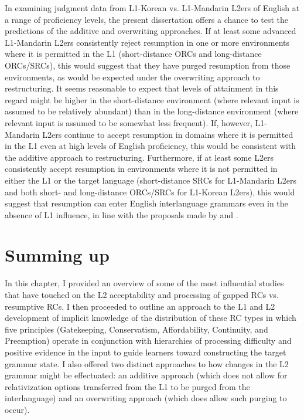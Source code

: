 In examining judgment data from L1-Korean vs. L1-Mandarin L2ers of English at a range of proficiency levels, the present dissertation offers a chance to test the predictions of the additive and overwriting approaches. If at least some advanced L1-Mandarin L2ers consistently reject resumption in one or more environments where it is permitted in the L1 (short-distance ORCs and long-distance ORCs/SRCs), this would suggest that they have purged resumption from those environments, as would be expected under the overwriting approach to restructuring. It seems reasonable to expect that levels of attainment in this regard might be higher in the short-distance environment (where relevant input is assumed to be relatively abundant) than in the long-distance environment (where relevant input is assumed to be somewhat less frequent). If, however, L1-Mandarin L2ers continue to accept resumption in domains where it is permitted in the L1 even at high levels of English proficiency, this would be consistent with the additive approach to restructuring. Furthermore, if at least some L2ers consistently accept resumption in environments where it is not permitted in either the L1 or the target language (short-distance SRCs for L1-Mandarin L2ers and both short- and long-distance ORCs/SRCs for L1-Korean L2ers), this would suggest that resumption can enter English interlanguage grammars even in the absence of L1 influence, in line with the proposals made by \textcite{hyltenstam1984,hyltenstam1990} and \textcite{eckman2004}.

\section{Summing up}\label{acq-conclusion}

In this chapter, I provided an overview of some of the most influential studies that have touched on the L2 acceptability and processing of gapped RCs vs. resumptive RCs. I then proceeded to outline an approach to the L1 and L2 development of implicit knowledge of the distribution of these RC types in which five principles (Gatekeeping, Conservatism, Affordability, Continuity, and Preemption) operate in conjunction with hierarchies of processing difficulty and positive evidence in the input to guide learners toward constructing the target grammar state. I also offered two distinct approaches to how changes in the L2 grammar might be effectuated: an additive approach (which does not allow for relativization options transferred from the L1 to be purged from the interlanguage) and an overwriting approach (which does allow such purging to occur).

